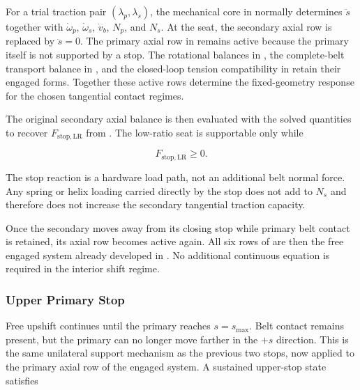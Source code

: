 \documentclass[11pt]{report}
\numberwithin{equation}{section}
\begin{document}
For a trial traction pair \((\lambda_p,\lambda_s)\), the mechanical core in
 normally determines
\(\ddot s\) together with
\(\dot\omega_p\), \(\dot\omega_s\), \(\dot v_b\), \(N_p\), and \(N_s\).
At the seat, the secondary axial row is replaced by \(\ddot s=0\). The primary
axial row in  remains active
because the primary itself is not supported by a stop. The rotational
balances in
,
the complete-belt transport balance in
, and the closed-loop tension
compatibility in  retain their
engaged forms. Together these active rows determine the fixed-geometry
response for the chosen tangential contact regimes.

The original secondary axial balance is then evaluated with the solved
quantities to recover \(F_{\mathrm{stop,LR}}\) from
. The low-ratio seat is supportable only
while

\begin{equation}
    F_{\mathrm{stop,LR}}\geq0.
    \label{eq:low_ratio_stop_admissibility}
\end{equation}

The stop reaction is a hardware load path, not an additional belt normal
force. Any spring or helix loading carried directly by the stop does not add
to \(N_s\) and therefore does not increase the secondary tangential traction
capacity.

Once the secondary moves away from its closing stop while primary belt
contact is retained, its axial row becomes active again. All six rows of
 are then the free engaged system
already developed in . No additional
continuous equation is required in the interior shift regime.

\subsubsection{Upper Primary Stop}
\label{sec:upper_primary_stop_regime}

Free upshift continues until the primary reaches \(s=s_{\max}\). Belt contact
remains present, but the primary can no longer move farther in the \(+s\)
direction. This is the same unilateral support mechanism as the previous two
stops, now applied to the primary axial row of the engaged system. A sustained
upper-stop state satisfies
\end{document}
